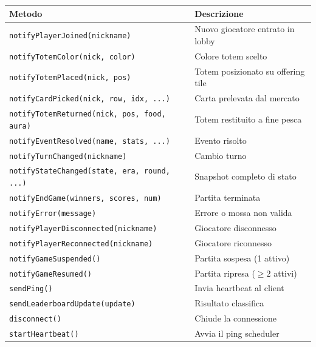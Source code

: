 \documentclass[a4paper,12pt]{article}
\newcommand{\code}[1]{\texttt{#1}}
\begin{document}
\begin{small}
\begin{tabularx}{\textwidth}{@{}p{6.5cm}X@{}}
\toprule
\textbf{Metodo} & \textbf{Descrizione} \\
\midrule
\code{notifyPlayerJoined(nickname)}               & Nuovo giocatore entrato in lobby \\
\code{notifyTotemColor(nick, color)}               & Colore totem scelto \\
\code{notifyTotemPlaced(nick, pos)}                & Totem posizionato su offering tile \\
\code{notifyCardPicked(nick, row, idx, ...)}        & Carta prelevata dal mercato \\
\code{notifyTotemReturned(nick, pos, food, aura)}  & Totem restituito a fine pesca \\
\code{notifyEventResolved(name, stats, ...)}        & Evento risolto \\
\code{notifyTurnChanged(nickname)}                 & Cambio turno \\
\code{notifyStateChanged(state, era, round, ...)}   & Snapshot completo di stato \\
\code{notifyEndGame(winners, scores, num)}          & Partita terminata \\
\code{notifyError(message)}                        & Errore o mossa non valida \\
\code{notifyPlayerDisconnected(nickname)}          & Giocatore disconnesso \\
\code{notifyPlayerReconnected(nickname)}           & Giocatore riconnesso \\
\code{notifyGameSuspended()}                       & Partita sospesa (1 attivo) \\
\code{notifyGameResumed()}                         & Partita ripresa (\(\geq 2\) attivi) \\
\code{sendPing()}                                  & Invia heartbeat al client \\
\code{sendLeaderboardUpdate(update)}               & Risultato classifica \\
\code{disconnect()}                                & Chiude la connessione \\
\code{startHeartbeat()}                            & Avvia il ping scheduler \\
\bottomrule
\end{tabularx}
\end{small}

\newpage
\end{document}

